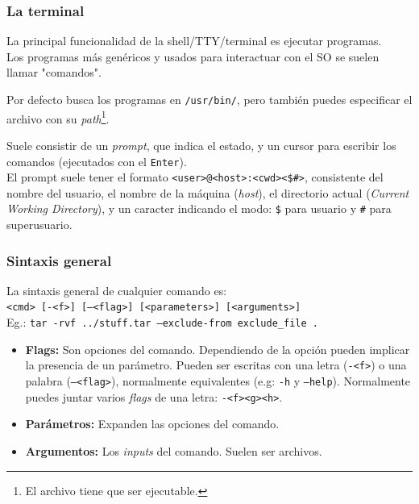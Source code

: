 \documentclass[aspectratio=43]{beamer}
\begin{document}
\begin{frame}
    \frametitle{La terminal}
    La principal funcionalidad de la shell/TTY/terminal es ejecutar programas.\\
    Los programas más genéricos y usados para interactuar con el SO se suelen llamar "comandos".\newline

    Por defecto busca los programas en \texttt{/usr/bin/}, pero también puedes especificar el archivo con su \textit{path}\footnote{El archivo tiene que ser ejecutable.}.\newline

    Suele consistir de un \textit{prompt}, que indica el estado, y un cursor para escribir los comandos (ejecutados con el \texttt{Enter}).\\
    El prompt suele tener el formato \texttt{<user>@<host>:<cwd><\$\#>}, consistente del nombre del usuario, el nombre de la máquina (\textit{host}), el directorio actual (\textit{Current Working Directory}), y un caracter indicando el modo: \texttt{\$} para usuario y \texttt{\#} para superusuario.

\end{frame}


\begin{frame}
    \frametitle{Sintaxis general}
    
    La sintaxis general de cualquier comando es:\\
    \texttt{<cmd> [-<f>] [--<flag>] [<parameters>] [<arguments>]}\\
    Eg.: \texttt{tar -rvf ../stuff.tar --exclude-from exclude\_file .}

    \begin{itemize}
        \item \textbf{Flags:} Son opciones del comando. Dependiendo de la opción pueden implicar la presencia de un parámetro. Pueden ser escritas con una letra (\texttt{-<f>}) o una palabra (\texttt{--<flag>}), normalmente equivalentes (e.g: \texttt{-h} y \texttt{--help}). Normalmente puedes juntar varios \textit{flags} de una letra: \texttt{-<f><g><h>}.
        \item \textbf{Parámetros:} Expanden las opciones del comando.
        \item \textbf{Argumentos:} Los \textit{inputs} del comando. Suelen ser archivos.
    \end{itemize}
    

\end{frame}
\end{document}

